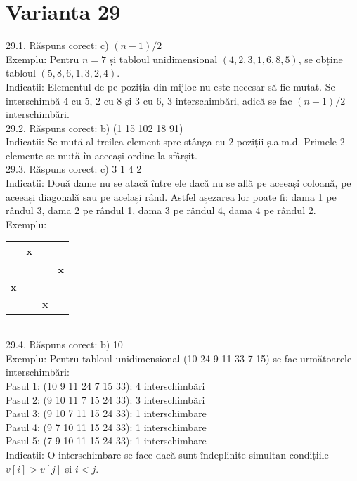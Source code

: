 \section*{Varianta 29}

29.1. Răspuns corect: c) $(n-1)/2$\\
Exemplu: Pentru $n=7$ și tabloul unidimensional $(4, 2, 3, 1, 6, 8, 5)$, se obține tabloul $(5, 8, 6, 1, 3, 2, 4)$.\\ Indicații: Elementul de pe poziția din mijloc nu este necesar să fie mutat. Se interschimbă 4 cu 5, 2 cu 8 și 3 cu 6, 3 interschimbări, adică se fac $(n-1)/2$ interschimbări.\\

29.2. Răspuns corect: b) (1 15 102 18 91)\\
Indicații: Se mută al treilea element spre stânga cu 2 poziții ș.a.m.d. Primele 2 elemente se mută în aceeași ordine la sfârș̦it.\\

29.3. Răspuns corect: c) 3 1 4 2\\
Indicații: Două dame nu se atacă între ele dacă nu se află pe aceeași coloană, pe aceeași diagonală sau pe același rând. Astfel așezarea lor poate fi: dama 1 pe rândul 3, dama 2 pe rândul 1, dama 3 pe rândul 4, dama 4 pe rândul 2.\\ Exemplu:\\ \begin{tabular}{|c|c|c|c|} \hline & $\mathbf{x}$ & & \\ \hline & & & $\mathbf{x}$ \\ \hline $\mathbf{x}$ & & & \\ \hline & & $\mathbf{x}$ & \\ \hline \end{tabular}\\

29.4. Răspuns corect: b) 10\\
Exemplu: Pentru tabloul unidimensional (10 24 9 11 33 7 15) se fac următoarele interschimbări:\\ Pasul 1: (10 9 11 24 7 15 33): 4 interschimbări\\ Pasul 2: (9 10 11 7 15 24 33): 3 interschimbări\\ Pasul 3: (9 10 7 11 15 24 33): 1 interschimbare\\ Pasul 4: (9 7 10 11 15 24 33): 1 interschimbare\\ Pasul 5: (7 9 10 11 15 24 33): 1 interschimbare\\ Indicații: O interschimbare se face dacă sunt îndeplinite simultan condițiile $v[i]>v[j]$ și $i<j$.\\

